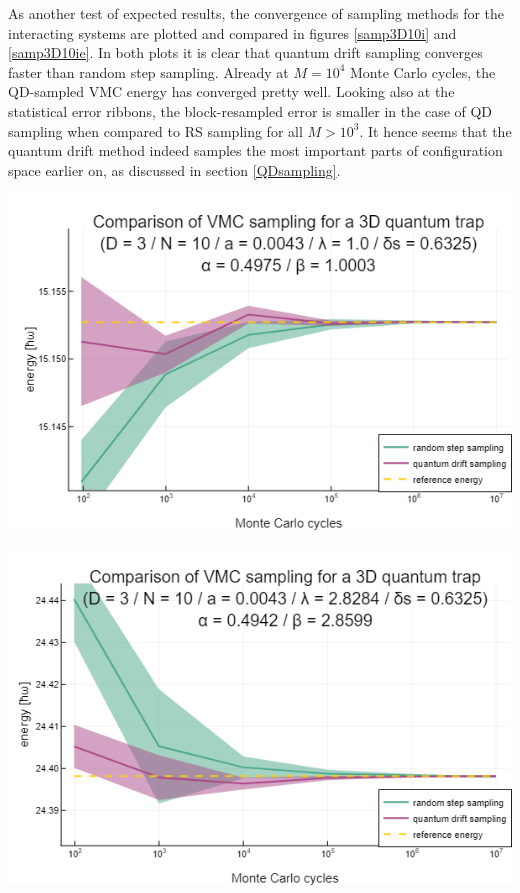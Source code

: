 \documentclass[a4paper,8pt]{article}
\begin{document}
\begin{multicols}{2}
As another test of expected results, the convergence of sampling methods for the interacting systems are plotted and compared in figures \ref{samp3D10i} and \ref{samp3D10ie}. In both plots it is clear that quantum drift sampling converges faster than random step sampling. Already at ${M = 10^4}$ Monte Carlo cycles, the QD-sampled VMC energy has converged pretty well. Looking also at the statistical error ribbons, the block-resampled error is smaller in the case of QD sampling when compared to RS sampling for all $M > 10^3$. It hence seems that the quantum drift method indeed samples the most important parts of configuration space earlier on, as discussed in section \ref{QDsampling}.

\begin{center}
\includegraphics[width=0.9\columnwidth]{fig3D10i_sampling}
\label{samp3D10i}
\end{center}

\begin{center}
\includegraphics[width=0.9\columnwidth]{fig3D10ie_sampling}
\label{samp3D10ie}
\end{center}


\end{multicols}
\end{document}
